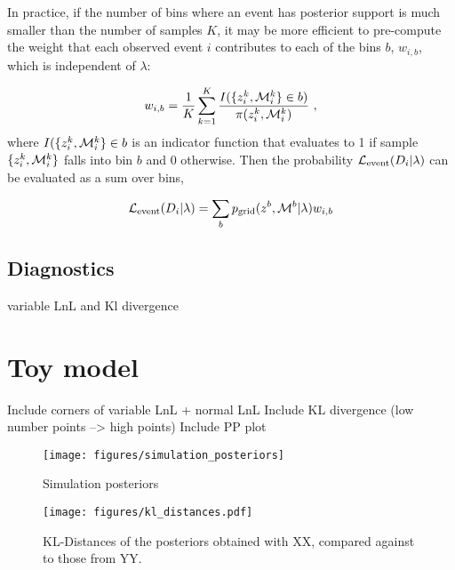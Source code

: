 \documentclass[twocolumn]{aastex631}
\begin{document}
In practice, if the number of bins where an event has posterior support is much smaller than the number of samples $K$, it may be more efficient to pre-compute the weight that each observed event $i$ contributes to each of the bins $b$, $w_{i,b}$, which is independent of $\lambda$:

\begin{equation}
    w_{i,b} = \frac{1}{K} \sum^K_{k=1} \frac{I(\{z^k_i,\Mc^k_i\} \in b)}{\pi(z_i^k,\Mc_i^k)} \ ,
\end{equation}
where $I(\{z^k_i,\mathcal{M}^k_i\} \in b$ is an indicator function that evaluates to 1 if sample $\{z^k_i,\mathcal{M}^k_i\}$ falls into bin $b$ and $0$ otherwise.
Then the probability $\mathcal{L}_{\rm event}(D_i|\lambda)$ can be evaluated as a sum over bins,

\begin{equation}
    \Le(D_i|\lambda) = \sum_b \pg(z^b, \Mc^b | \lambda) w_{i,b}
\end{equation}


\subsection{Diagnostics}
variable LnL and Kl divergence

\section{Toy model}
Include corners of variable LnL + normal LnL
Include KL divergence (low number points --> high points)
Include PP plot

\begin{figure}[ht!]
    \begin{centering}
        \texttt{[image: figures/simulation\_posteriors]}
        \caption{
            Simulation posteriors
        }
        \label{fig:simulation_posteriors}
    \end{centering}
\end{figure}




\begin{figure}[ht!]
    \begin{centering}
        \texttt{[image: figures/kl\_distances.pdf]}
        \caption{
            KL-Distances of the posteriors obtained with XX, compared against to those from YY.
        }
        \label{fig:kl_distances}
    \end{centering}
\end{figure}
\end{document}
